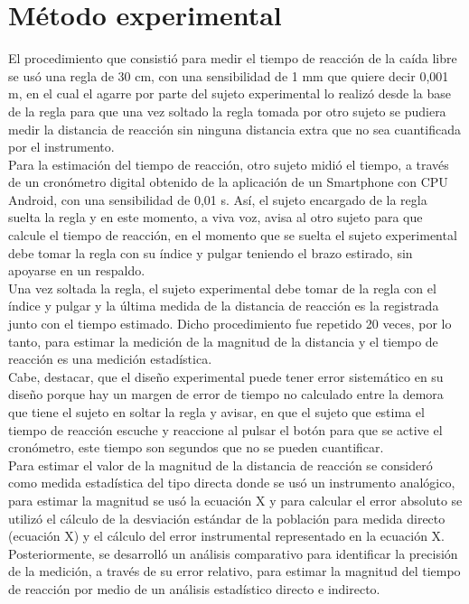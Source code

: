 \documentclass[runningheads]{llncs}
\begin{document}
    \section*{\centering Método experimental}
    
    El procedimiento que consistió para medir el tiempo de reacción de la caída libre se usó una regla de 30 cm, con una sensibilidad de 1 mm que quiere decir 0,001 m, en el cual el agarre por parte del sujeto experimental lo realizó desde la base de la regla para que una vez soltado la regla tomada por otro sujeto se pudiera medir la distancia de reacción sin ninguna distancia extra que no sea cuantificada por el instrumento. \\
    \linebreak
    Para la estimación del tiempo de reacción, otro sujeto midió el tiempo, a través de un cronómetro digital obtenido de la aplicación de un Smartphone con CPU Android, con una sensibilidad de 0,01 s. Así, el sujeto encargado de la regla suelta la regla y en este momento, a viva voz, avisa al otro sujeto para que calcule el tiempo de reacción, en el momento que se suelta el sujeto experimental debe tomar la regla con su índice y pulgar teniendo el brazo estirado, sin apoyarse en un respaldo. \\
    \linebreak
    Una vez soltada la regla, el sujeto experimental debe tomar de la regla con el índice y pulgar y la última medida de la distancia de reacción es la registrada junto con el tiempo estimado. Dicho procedimiento fue repetido 20 veces, por lo tanto, para estimar la medición de la magnitud de la distancia y el tiempo de reacción es una medición estadística. \\
    \linebreak
    Cabe, destacar, que el diseño experimental puede tener error sistemático en su diseño porque hay un margen de error de tiempo no calculado entre la demora que tiene el sujeto en soltar la regla y avisar, en que el sujeto que estima el tiempo de reacción escuche y reaccione al pulsar el botón para que se active el cronómetro, este tiempo son segundos que no se pueden cuantificar. \\
    \linebreak
    Para estimar el valor de la magnitud de la distancia de reacción se consideró como medida estadística del tipo directa donde se usó un instrumento analógico, para estimar la magnitud se usó la ecuación X y para calcular el error absoluto se utilizó el cálculo de la desviación estándar de la población para medida directo (ecuación X) y el cálculo del error instrumental representado en la ecuación X. \\
    \linebreak
    Posteriormente, se desarrolló un análisis comparativo para identificar la precisión de la medición, a través de su error relativo, para estimar la magnitud del tiempo de reacción por medio de un análisis estadístico directo e indirecto. \\
    \linebreak
\end{document}
